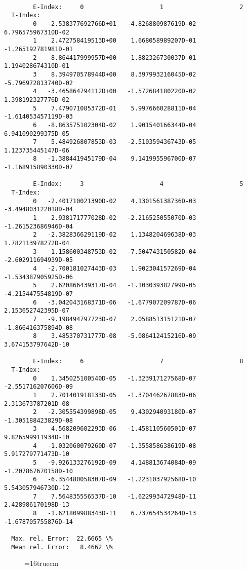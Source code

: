 \documentclass[12pt,dvipdfmx]{article}
\begin{document}
\begin{small}\begin{verbatim}

        E-Index:     0                     1                     2
  T-Index:
        0   -2.538377692766D+01   -4.826880987619D-02    6.796575967310D-02
        1    2.472758419513D+00    1.668058989207D-01   -1.265192781981D-01
        2   -8.864417999957D+00   -1.882326730037D-01    1.194028674310D-01
        3    8.394970578944D+00    8.397993216045D-02   -5.796972813740D-02
        4   -3.465864794112D+00   -1.572684180220D-02    1.398192327776D-02
        5    7.479071085372D-01    5.997666028811D-04   -1.614053457119D-03
        6   -8.863575102304D-02    1.901540166344D-04    6.941090299375D-05
        7    5.484926807853D-03   -2.510359436743D-05    1.123735445147D-06
        8   -1.388441945179D-04    9.141995596700D-07   -1.168915890330D-07

        E-Index:     3                     4                     5
  T-Index:
        0   -2.401710021390D-02    4.130156138736D-03   -3.494803122018D-04
        1    2.938171777028D-02   -2.216525055070D-03   -1.261523686946D-04
        2   -2.382836629119D-02    1.134820469638D-03    1.782113978272D-04
        3    1.158600348753D-02   -7.504743150582D-04   -2.602911694939D-05
        4   -2.700181027443D-03    1.902304157269D-04   -1.534387905925D-06
        5    2.620866439317D-04   -1.103039382799D-05   -4.215447554819D-07
        6   -3.042043168371D-06   -1.677907209787D-06    2.153652742395D-07
        7   -9.198494797723D-07    2.058851315121D-07   -1.866416375894D-08
        8    3.485370731777D-08   -5.086412415216D-09    3.674153797642D-10

        E-Index:     6                     7                     8
  T-Index:
        0    1.345025100540D-05   -1.323917127568D-07   -2.551716207606D-09
        1    2.701401918133D-05   -1.370446267883D-06    2.313673787201D-08
        2   -2.305554399898D-05    9.430294093180D-07   -1.305188423829D-08
        3    4.568209602293D-06   -1.458110560501D-07    9.826599911934D-10
        4   -1.032060079260D-07   -1.355858638619D-08    5.917279771473D-10
        5   -9.926133276192D-09    4.148813674084D-09   -1.207867670158D-10
        6   -6.354480058307D-09   -1.223103792568D-10    5.543057946730D-12
        7    7.564835556537D-10   -1.622993472948D-11    2.428986170198D-13
        8   -1.621809988343D-11    6.737654534264D-13   -1.678705755876D-14

  Max. rel. Error:  22.6665 \%
  Mean rel. Error:   8.4662 \%
\end{verbatim}\end{small}
\begin{figure} \label{2.3.13aer}
\epsfxsize=16truecm
\end{figure}
\newpage
\end{document}
